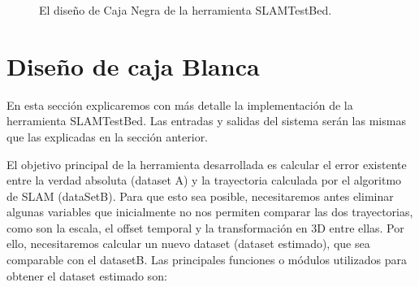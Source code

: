 \begin{figure}[H]
\begin{center}
\hspace{0.5cm}
\end{center}
\caption{ El diseño de Caja Negra de la herramienta SLAMTestBed. }
\end{figure}

\section{Diseño de caja Blanca}
En esta sección explicaremos con más detalle la implementación de la herramienta SLAMTestBed.
Las entradas y salidas del sistema serán las mismas que las explicadas en la sección anterior.

El objetivo principal de la herramienta desarrollada es calcular el error existente entre la verdad absoluta (dataset A) y la trayectoria calculada por el algoritmo de SLAM (dataSetB). Para que esto sea posible, necesitaremos antes eliminar algunas variables que inicialmente no nos permiten comparar las dos trayectorias, como son la escala, el offset temporal y la transformación en 3D entre ellas. Por ello, necesitaremos calcular un nuevo dataset (dataset estimado), que sea comparable con el datasetB. Las principales funciones o módulos utilizados para obtener el dataset estimado son:

